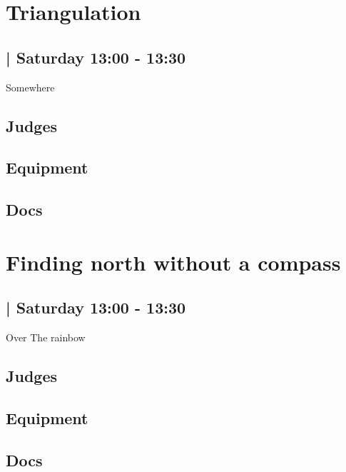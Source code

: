 \documentclass[10pt]{article}
\begin{document}
		\begin{minipage}{\linewidth}
		\setcounter{section}{24}
	\section{Triangulation }
	\subsection*{ | Saturday 13:00 - 13:30}

	Somewhere

	\begin{multicols}{2}
	\subsection*{\faUsers \: Judges}
	\begin{itemize}
		\end{itemize}
	\columnbreak
	\subsection*{\faWrench \: Equipment}
	        \vfill\null
        \subsection*{\faFile \: Docs}
     	\end{multicols}


	\vspace{1cm}
	\end{minipage}

		\begin{minipage}{\linewidth}
		\setcounter{section}{25}
	\section{Finding north without a compass }
	\subsection*{ | Saturday 13:00 - 13:30}

	Over The rainbow

	\begin{multicols}{2}
	\subsection*{\faUsers \: Judges}
	\begin{itemize}
		\end{itemize}
	\columnbreak
	\subsection*{\faWrench \: Equipment}
	        \vfill\null
        \subsection*{\faFile \: Docs}
     	\end{multicols}


	\vspace{1cm}
	\end{minipage}
\end{document}
